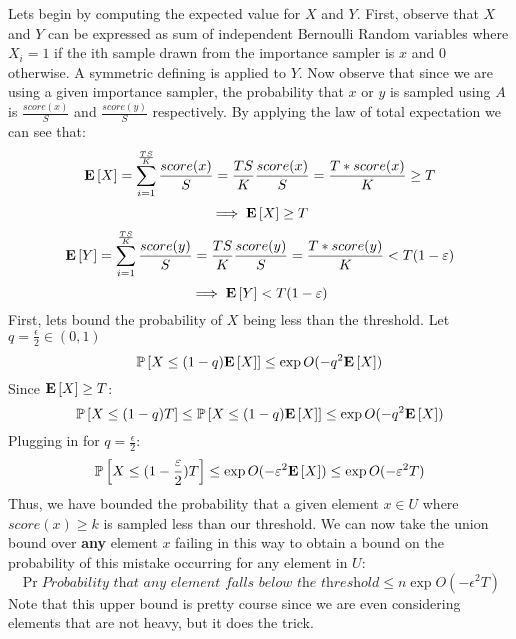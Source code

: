 \documentclass[12pt]{article}
\begin{document}
\begin{solution}
Lets begin by computing the expected value for $X$ and $Y$. First, observe that $X$ and $Y$ can be expressed as sum of independent Bernoulli Random variables where $X_i = 1$ if the ith sample drawn from the importance sampler is $x$ and $0$ otherwise. A symmetric defining is applied to $Y$. Now observe that since we are using a given importance sampler, the probability that $x$ or $y$ is sampled using $A$ is $\frac{score(x)}{S}$ and $\frac{score(y)}{S}$ respectively. By applying the law of total expectation we can see that:
\[
\mathbf{E}\left[X\right] = \sum_{i=1}^{\frac{TS}{K}}{\frac{score(x)}{S}} = \frac{TS}{K}\frac{score(x)}{S} = \frac{T * score(x)}{K} \geq T
\]
\[
\implies \mathbf{E}\left[X\right] \geq T
\]
\[
\mathbf{E}\left[Y\right] = \sum_{i=1}^{\frac{TS}{K}}{\frac{score(y)}{S}} = \frac{TS}{K}\frac{score(y)}{S} = \frac{T * score(y)}{K} < T (1-\varepsilon)
\]
\[
\implies \mathbf{E}\left[Y\right] < T(1-\varepsilon)
\]
First, lets bound the probability of $X$ being less than the threshold. Let $q = \frac{\epsilon}{2} \in (0,1)$
\[
\mathbb{P}\left[X \leq (1-q)\mathbf{E}\left[X\right]\right] \leq \exp{O(-q^2\mathbf{E}\left[X\right])}
\]
Since $\mathbf{E}\left[X\right] \geq T$:
\[
\mathbb{P}\left[X \leq (1-q)T\right] \leq \mathbb{P}\left[X \leq (1-q)\mathbf{E}\left[X\right]\right] \leq \exp{O(-q^2\mathbf{E}\left[X\right])}
\]
Plugging in for $q = \frac{\epsilon}{2}$:
\[
\mathbb{P}\left[X \leq (1-\frac{\varepsilon}{2})T\right] \leq \exp{O(-\varepsilon^2\mathbf{E}\left[X\right])} \leq \exp{O(-\varepsilon^2T)}
\]
Thus, we have bounded the probability that a given element $x \in U$ where $score(x) \geq k$ is sampled less than our threshold. We can now take the union bound over \textbf{any} element $x$ failing in this way to obtain a bound on the probability of this mistake occurring for any element in $U$:
\[
\Pr{\textit{Probability that any element falls below the threshold}} \leq n\exp{O(-\epsilon^2T)}
\]
Note that this upper bound is pretty course since we are even considering elements that are not heavy, but it does the trick.\\


\end{solution}
\end{document}
